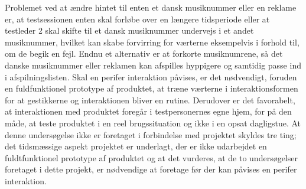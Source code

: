 Problemet ved at ændre hintet til enten et dansk musiknummer eller en reklame er, at testsessionen enten skal forløbe over en længere tidsperiode eller at testleder 2 skal skifte til et dansk musiknummer undervejs i et andet musiknummer, hvilket kan skabe forvirring for værterne eksempelvis i forhold til, om de begik en fejl. Endnu et alternativ er at forkorte musiknumrene, så det danske musiknummer eller reklamen kan afspilles hyppigere og samtidig passe ind i afspilningslisten.\blankline
%
Skal en perifer interaktion påvises, er det nødvendigt, foruden en fuldfunktionel prototype af produktet, at træne værterne i interaktionsformen for at gestikkerne og interaktionen bliver en rutine. Derudover er det favorabelt, at interaktionen med produktet foregår i testpersonernes egne hjem, for på den måde, at teste produktet i en reel brugssituation og ikke i en opsat dagligstue. At denne undersøgelse ikke er foretaget i forbindelse med projektet skyldes tre ting; det tidsmæssige aspekt projektet er underlagt, der er ikke udarbejdet en fuldtfunktionel prototype af produktet og at det vurderes, at de to undersøgelser foretaget i dette projekt, er nødvendige at foretage før der kan påvises en perifer interaktion.     
% 